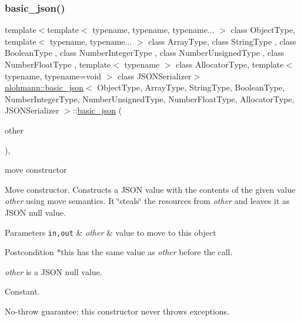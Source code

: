 \subsubsection{\texorpdfstring{basic\+\_\+json()}{basic\_json()}\hspace{0.1cm}{\footnotesize\ttfamily [9/9]}}
{\footnotesize\ttfamily template$<$template$<$ typename, typename, typename... $>$ class Object\+Type, template$<$ typename, typename... $>$ class Array\+Type, class String\+Type , class Boolean\+Type , class Number\+Integer\+Type , class Number\+Unsigned\+Type , class Number\+Float\+Type , template$<$ typename $>$ class Allocator\+Type, template$<$ typename, typename=void $>$ class J\+S\+O\+N\+Serializer$>$ \\
\hyperlink{classnlohmann_1_1basic__json}{nlohmann\+::basic\+\_\+json}$<$ Object\+Type, Array\+Type, String\+Type, Boolean\+Type, Number\+Integer\+Type, Number\+Unsigned\+Type, Number\+Float\+Type, Allocator\+Type, J\+S\+O\+N\+Serializer $>$\+::\hyperlink{classnlohmann_1_1basic__json}{basic\+\_\+json} (\begin{DoxyParamCaption}\item[{\hyperlink{classnlohmann_1_1basic__json}{basic\+\_\+json}$<$ Object\+Type, Array\+Type, String\+Type, Boolean\+Type, Number\+Integer\+Type, Number\+Unsigned\+Type, Number\+Float\+Type, Allocator\+Type, J\+S\+O\+N\+Serializer $>$ \&\&}]{other }\end{DoxyParamCaption})\hspace{0.3cm}{\ttfamily [inline]}, {\ttfamily [noexcept]}}



move constructor 

Move constructor. Constructs a J\+S\+ON value with the contents of the given value {\itshape other} using move semantics. It \char`\"{}steals\char`\"{} the resources from {\itshape other} and leaves it as J\+S\+ON null value.


\begin{DoxyParams}[1]{Parameters}
\mbox{\tt in,out}  & {\em other} & value to move to this object\\
\hline
\end{DoxyParams}
\begin{DoxyPostcond}{Postcondition}
{\ttfamily $\ast$this} has the same value as {\itshape other} before the call. 

{\itshape other} is a J\+S\+ON null value.
\end{DoxyPostcond}
Constant.

No-\/throw guarantee\+: this constructor never throws exceptions.

